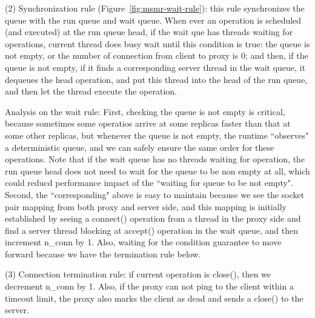 (2) Synchronization rule (Figure~\ref{fig:msmr-wait-rule}): this rule synchronizes the \paxos queue with the 
\smt run queue and wait queue. When ever an operation is scheduled (and executed) at the \smt run queue 
head, if the wait que has threads waiting for \paxos operations, current thread does busy wait until
this condition is true: the \paxos queue is not empty, 
or the number of connection from client to proxy is 0; and then, if the \paxos 
queue is not empty, if it finds a 
corresponding server thread in the wait queue, it dequeues the head \paxos operation, 
and put this thread into the head of the run 
queue, and then let the thread execute the \paxos operation. 

Analysis on the wait rule: First, checking the \paxos queue is not 
empty is critical, because sometimes some operatios arrive at some replicas 
faster than that at some other replicas, but whenever the \paxos queue is not 
empty, the \smt runtime ``observes" a deterministic \paxos queue, and
we can safely ensure the same order for these \paxos operations.
Note that if the wait queue has no threads waiting for \paxos operation, the 
run queue head does not need to wait for the \paxos queue to be non empty at 
all, which could reducd performance impact of the ``waiting for \paxos queue to be not empty".
Second, the ``corresponding" above is easy to maintain because we see the socket pair mapping from 
both proxy and server side, and this mapping is initially established by seeing 
a connect() operation from a thread in the proxy side and find a server thread blocking at accept() 
operation in the wait queue, and then increment n\_conn by 1. Also, waiting for the 
condition guarantee to move forward because we have the termination rule below.

(3) Connection termination rule: if current \paxos operation is close(), then 
we decrement n\_conn by 1. Also, if 
the proxy can not ping to the client within a timeout limit, the proxy also 
marks the client as dead and sends a close() to the server.


